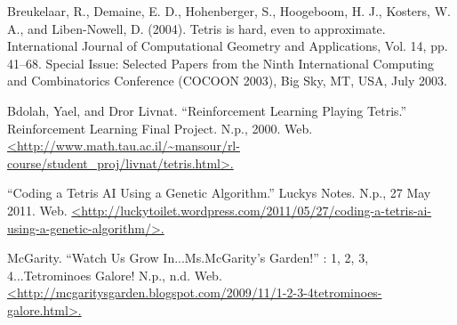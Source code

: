 \documentclass{article}
\begin{document}
\begin{thebibliography}{1}

 Breukelaar, R., Demaine, E. D., Hohenberger, S., Hoogeboom, H. J., Kosters, W. A., and Liben-Nowell, D. (2004). Tetris is hard, even to approximate. International Journal of Computational Geometry and Applications, Vol. 14, pp. 41–68. Special Issue: Selected Papers from the Ninth International Computing and Combinatorics Conference (COCOON 2003), Big Sky, MT, USA, July 2003.

 Bdolah, Yael, and Dror Livnat. ``Reinforcement Learning Playing Tetris.'' Reinforcement Learning Final Project. N.p., 2000. Web. \url{<http://www.math.tau.ac.il/~mansour/rl-course/student_proj/livnat/tetris.html>.}

 ``Coding a Tetris AI Using a Genetic Algorithm.'' Luckys Notes. N.p., 27 May 2011. Web. \url{<http://luckytoilet.wordpress.com/2011/05/27/coding-a-tetris-ai-using-a-genetic-algorithm/>.}

 McGarity. ``Watch Us Grow In...Ms.McGarity's Garden!'' : 1, 2, 3, 4...Tetrominoes Galore! N.p., n.d. Web. \url{<http://mcgaritysgarden.blogspot.com/2009/11/1-2-3-4tetrominoes-galore.html>.}

\end{thebibliography}
\end{document}
